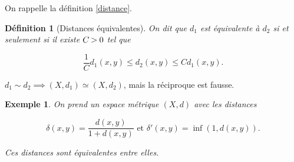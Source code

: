 \documentclass[french]{book}
\newtheorem{definition}{Définition}[section]
\newtheorem{exemple}{Exemple}
\newcommand{\biggg}{\rotatebox[origin=c]{90}{$\lor$}}
\newcommand{\bg}{\ \biggg\ }
\begin{document}
On rappelle la définition \ref{distance}.

\begin{definition}[Distances équivalentes]
  On dit que $d_1$ est équivalente à $d_2$ si et seulement si il existe \(C \bg 0\) tel que

  \[\frac{1}{C}d_1(x,y) \leq d_2(x,y) \leq C d_1(x,y).\]
\end{definition}

\(d_1 \sim d_2 \implies (X,d_1) \simeq (X,d_2)\), mais la réciproque est fausse.

\begin{exemple}
  On prend un espace métrique \((X,d)\) avec les distances

  \[\delta(x,y) = \frac{d(x,y)}{1+ d(x,y)} \text{ et } \delta'(x,y) = \inf(1, d(x,y)).\]

  Ces distances sont équivalentes entre elles.%
\end{exemple}
\end{document}

